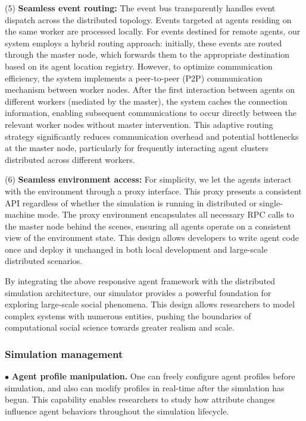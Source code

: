 \documentclass{article}
\theoremstyle{definition}
\theoremstyle{theorem}
\theoremstyle{proof}
\theoremstyle{remark}
\begin{document}
    (5) \textbf{Seamless event routing:} The event bus transparently handles event dispatch across the distributed topology. Events targeted at agents residing on the same worker are processed locally. For events destined for remote agents, our system employs a hybrid routing approach: initially, these events are routed through the master node, which forwards them to the appropriate destination based on its agent location registry. However, to optimize communication efficiency, the system implements a peer-to-peer (P2P) communication mechanism between worker nodes. After the first interaction between agents on different workers (mediated by the master), the system caches the connection information, enabling subsequent communications to occur directly between the relevant worker nodes without master intervention. This adaptive routing strategy significantly reduces communication overhead and potential bottlenecks at the master node, particularly for frequently interacting agent clusters distributed across different workers.
    
    (6) \textbf{Seamless environment access:} 
    For simplicity, we let the agents interact with the environment through a proxy interface. This proxy presents a consistent API regardless of whether the simulation is running in distributed or single-machine mode. The proxy environment encapsulates all necessary RPC calls to the master node behind the scenes, ensuring all agents operate on a consistent view of the environment state. This design allows developers to write agent code once and deploy it unchanged in both local development and large-scale distributed scenarios.
   
    By integrating the above responsive agent framework with the distributed simulation architecture, our simulator provides a powerful foundation for exploring large-scale social phenomena. This design allows researchers to model complex systems with numerous entities, pushing the boundaries of computational social science towards greater realism and scale.

    \subsubsection{Simulation management}
    

    $\bullet$ \textbf{Agent profile manipulation.} 
    One can freely configure agent profiles before simulation, and also can modify profiles in real-time after the simulation has begun. This capability enables researchers to study how attribute changes influence agent behaviors throughout the simulation lifecycle.
\end{document}
